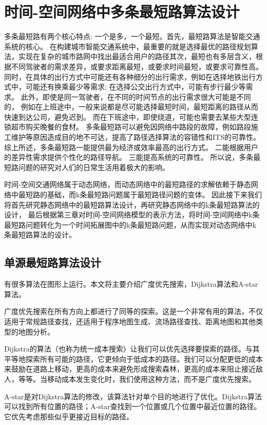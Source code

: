 \chapter{时间-空间网络中多条最短路算法设计}\label{ch:时间-空间网络中多条最短路算法设计}
多条最短路有两个核心特点: 一个是多，一个最短。首先，最短路算法是智能交通系统的核心。
在构建城市智能交通系统中，最重要的就是选择最优的路径规划算法，实现在复杂的城市路网中找出最适合用户的路径其次，最短也有多层含义，根据不同驾驶者的需求差异，或要求距离最短，或要求时间最短，或要求可靠性高。
同时，在具体的出行方式中可能还有各种细分的出行需求，例如在选择地铁出行方式中，可能还有换乘最少等需求;
在选择公交出行方式中，可能有步行最少等需求。
此外，即使是同一驾驶者，在不同的时间节点的出行需求很大可能是不同的，
例如在上班途中，一般来说都是尽可能选择最短时间，最短距离的路径从而快速到达公司，避免迟到。
而在下班途中，即使绕道，可能也需要去某些大型连锁超市购买晚餐的食材。
多条最短路可以避免因网络中路段的故障，例如路段施工维护等原因造成目的地不可达，提高了路径选择算法的容错性和ITS的可靠性。
综上所述，多条最短路一能提供最为经济或效率最高的出行方式。
二能根据用户的差异性需求提供个性化的路径导航。
三能提高系统的可靠性。
所以说，多条最短路问题的研究对人们的日常生活用着极大的影响。

时间-空间交通网络属于动态网络，而动态网络中的最短路径的求解依赖于静态网络中最短路的基础，而k条最短路问题属于最短路径问题的变体。
因此接下来我们将首先研究静态网络中的最短路算法设计，再研究静态网络中的k条最短路算法的设计，
最后根据第三章对时间-空间网络模型的表示方法，将时间-空间网络中k条最短路问题转化为一个时间拓展图中的k条最短路问题，从而实现对动态网络中k条最短路算法的设计。


\section{单源最短路算法设计}\label{sec:单源最短路算法设计}
有很多算法在图形上运行。本文将主要介绍广度优先搜索，Dijkstra算法和A-star算法。

广度优先搜索在所有方向上都进行了同等的探索。这是一个非常有用的算法，不仅适用于常规路径查找，还适用于程序地图生成、流场路径查找、距离地图和其他类型的地图分析。

Dijkstra的算法（也称为统一成本搜索）让我们可以优先选择要探索的路径。与其平等地探索所有可能的路径，它更倾向于低成本的路径。我们可以分配更低的成本来鼓励在道路上移动，更高的成本来避免形成搜索森林，更高的成本来阻止接近敌人，等等。当移动成本发生变化时，我们使用这种方法，而不是广度优先搜索。

A-star是对Dijkstra算法的修改，该算法针对单个目的地进行了优化。Dijkstra算法可以找到所有位置的路径；A-star查找到一个位置或几个位置中最近位置的路径。它优先考虑那些似乎更接近目标的路径。

